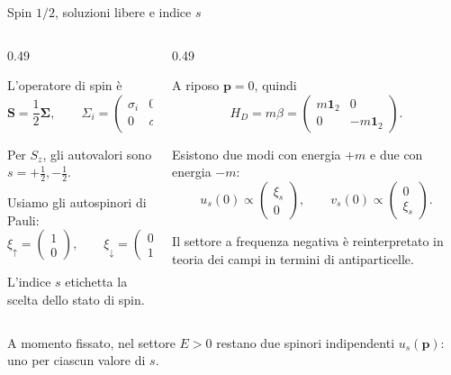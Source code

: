 \begin{frame}{Spin $1/2$, soluzioni libere e indice $s$}
\small

\begin{columns}[T,onlytextwidth]
\begin{column}{0.49\textwidth}

L'operatore di spin è
\[
\mathbf S=\frac12\boldsymbol\Sigma,
\qquad
\Sigma_i=
\begin{pmatrix}
\sigma_i&0\\
0&\sigma_i
\end{pmatrix}.
\]

Per $S_z$, gli autovalori sono
$s=+\frac12,-\frac12$.

Usiamo gli autospinori di Pauli:
\[
\xi_\uparrow=
\begin{pmatrix}1\\0\end{pmatrix},
\qquad
\xi_\downarrow=
\begin{pmatrix}0\\1\end{pmatrix}.
\]

L'indice $s$ etichetta la scelta
dello stato di spin.

\end{column}
\begin{column}{0.49\textwidth}

A riposo $\mathbf p=0$, quindi
\[
H_D=m\beta=
\begin{pmatrix}
m\mathbf1_2&0\\
0&-m\mathbf1_2
\end{pmatrix}.
\]

Esistono due modi con energia $+m$
e due con energia $-m$:
\[
u_s(0)\propto
\begin{pmatrix}\xi_s\\0\end{pmatrix},
\qquad
v_s(0)\propto
\begin{pmatrix}0\\\xi_s\end{pmatrix}.
\]

Il settore a frequenza negativa
è reinterpretato in teoria dei campi
in termini di antiparticelle.

\end{column}
\end{columns}

\medskip

A momento fissato, nel settore $E>0$
restano due spinori indipendenti
$u_s(\mathbf p)$: uno per ciascun valore di $s$.

\end{frame}

